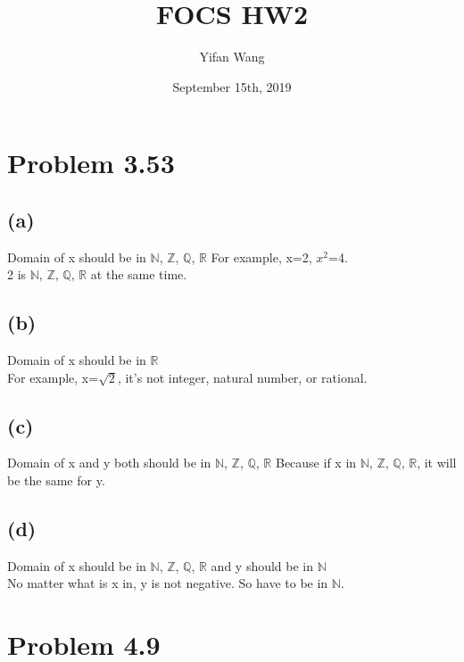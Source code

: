 \documentclass{article}
\title{FOCS HW2}
\author{Yifan Wang}
\date{September 15th, 2019}
\begin{document}
\maketitle

\newpage
\section*{Problem 3.53}
\subsection*{(a)}
Domain of x should be in
$\mathbb{N}$, $\mathbb{Z}$, $\mathbb{Q}$, $\mathbb{R}$
For example, x=2, $x^2$=4.\\
2 is $\mathbb{N}$, $\mathbb{Z}$, $\mathbb{Q}$, $\mathbb{R}$ at the same time.\\
\subsection*{(b)}
Domain of x should be in $\mathbb{R}$\\
For example, x=$\sqrt{2}$, it's not integer, natural number, or rational.
\subsection*{(c)}
Domain of x and y both should be in
$\mathbb{N}$, $\mathbb{Z}$, $\mathbb{Q}$, $\mathbb{R}$
Because if x in $\mathbb{N}$, $\mathbb{Z}$, $\mathbb{Q}$, $\mathbb{R}$, it will be the same for y.\\
\subsection*{(d)}
Domain of x should be in
$\mathbb{N}$, $\mathbb{Z}$, $\mathbb{Q}$, $\mathbb{R}$
and y should be in $\mathbb{N}$\\
No matter what is x in, y is not negative. So have to be in $\mathbb{N}$.\\





\newpage
\section*{Problem 4.9}
\end{document}
